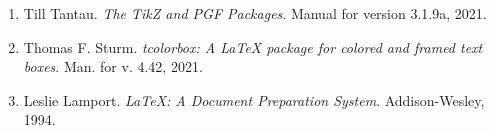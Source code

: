 \begin{enumerate}
    \item[{[1]}]\label{litA} Till Tantau. \textit{The TikZ and PGF Packages}. Manual for version 3.1.9a, 2021.
    \item[{[2]}]\label{litB} Thomas F. Sturm. \textit{tcolorbox: A LaTeX package for colored and framed text boxes}. Man. for v. 4.42, 2021.
    \item[{[3]}]\label{litC} Leslie Lamport. \textit{LaTeX: A Document Preparation System}. Addison-Wesley, 1994.
\end{enumerate}